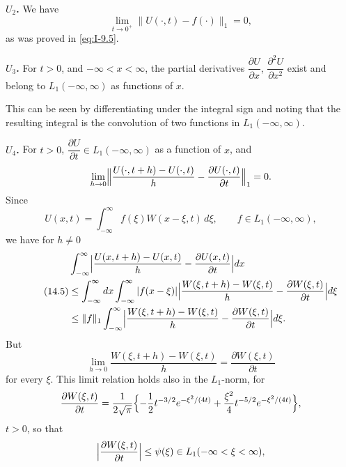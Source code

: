 \noindent\textbf{$U_2$.} We have
\begin{equation*}
\lim_{t\to 0^+}\|U(\cdot,t)-f(\cdot)\|_1=0,
\end{equation*}
as was proved in \eqref{eq:I-9.5}.

\noindent\textbf{$U_3$.} For $t>0$, and $-\infty<x<\infty$, the partial derivatives $\dfrac{\partial U}{\partial x}$, $\dfrac{\partial^{2}U}{\partial x^{2}}$ exist and belong to $L_1(-\infty,\infty)$ as functions of $x$.

This can be seen by differentiating under the integral sign and noting that the resulting integral is the convolution of two functions in $L_1(-\infty,\infty)$.

\noindent\textbf{$U_4$.} For $t>0$, $\dfrac{\partial U}{\partial t}\in L_1(-\infty,\infty)$ as a function of $x$, and
\begin{equation*}
\lim_{h\to 0}\Bigl\|\frac{U(\cdot,t+h)-U(\cdot,t)}{h}-\frac{\partial U(\cdot,t)}{\partial t}\Bigr\|_1=0.
\end{equation*}
Since
\begin{equation*}
U(x,t)=\int_{-\infty}^{\infty}f(\xi)W(x-\xi,t)\,d\xi,\qquad f\in L_1(-\infty,\infty),
\end{equation*}
we have for $h\neq 0$
\begin{equation}\label{eq:I-14.5}\tag{14.5}
\begin{aligned}
&\int_{-\infty}^{\infty}\Bigl|\frac{U(x,t+h)-U(x,t)}{h}-\frac{\partial U(x,t)}{\partial t}\Bigr|dx\\
&\le\int_{-\infty}^{\infty}dx\int_{-\infty}^{\infty}|f(x-\xi)|\Bigl|\frac{W(\xi,t+h)-W(\xi,t)}{h}-\frac{\partial W(\xi,t)}{\partial t}\Bigr|d\xi\\
&\le\|f\|_1\int_{-\infty}^{\infty}\Bigl|\frac{W(\xi,t+h)-W(\xi,t)}{h}-\frac{\partial W(\xi,t)}{\partial t}\Bigr|d\xi.
\end{aligned}
\end{equation}
But
\begin{equation*}
\lim_{h\to 0}\frac{W(\xi,t+h)-W(\xi,t)}{h}=\frac{\partial W(\xi,t)}{\partial t}
\end{equation*}
for every $\xi$. This limit relation holds also in the $L_1$-norm, for
\begin{equation*}
\frac{\partial W(\xi,t)}{\partial t}
=\frac{1}{2\sqrt{\pi}}\Bigl\{-\frac12t^{-3/2}e^{-\xi^{2}/(4t)}+\frac{\xi^{2}}{4}t^{-5/2}e^{-\xi^{2}/(4t)}\Bigr\},
\end{equation*}
$t>0$, so that
\begin{equation*}
\Bigl|\frac{\partial W(\xi,t)}{\partial t}\Bigr|\le\psi(\xi)\in L_1(-\infty<\xi<\infty),
\end{equation*}
